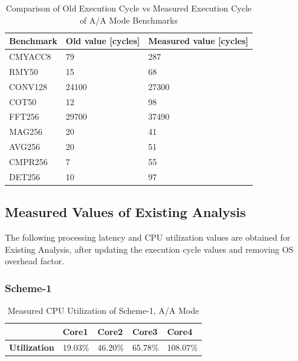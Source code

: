 \begin{table}[h!]
	\centering
	\begin{tabular}{|l|l|l|} 
	 \hline
	 \textbf{Benchmark} & \textbf{Old value [cycles]} & \textbf{Measured value [cycles]} \\
	 \hline
	 CMYACC8 & 79 & 287 \\ \hline
	 RMY50 & 15 & 68 \\ \hline
	 CONV128 & 24100 & 27300 \\ \hline
	 COT50 & 12 & 98 \\ \hline
	 FFT256 & 29700 & 37490 \\ \hline
	 MAG256 & 20 & 41 \\ \hline
	 AVG256 & 20 & 51 \\ \hline
	 CMPR256 & 7 & 55 \\ \hline
	 DET256 & 10 & 97 \\ \hline
	\end{tabular}
	\caption{Comparison of Old Execution Cycle vs Measured Execution Cycle of A/A Mode Benchmarks}
	\label{tbl:mm:aa_real_exe_cycle}
\end{table}

\FloatBarrier
\subsection{Measured Values of Existing Analysis}
\label{mm:cons:real_values}

The following processing latency and CPU utilization values are obtained for Existing Analysis, after updating the execution cycle values and removing OS overhead factor.

\subsubsection{Scheme-1}
\begin{table}[h!]
	\centering
	\begin{tabular}{|l|l|l|l|l|} 
	 \hline
	& \textbf{Core1} & \textbf{Core2} & \textbf{Core3} & \textbf{Core4} \\ \hline
	\textbf{Utilization} & 19.03\% & 46.20\% & 65.78\% & {\color{red} 108.07\%} \\ \hline
	\end{tabular}
	\caption{Measured CPU Utilization of Scheme-1, A/A Mode}
	\label{tbl:mm:scheme1_true_util}
\end{table}

